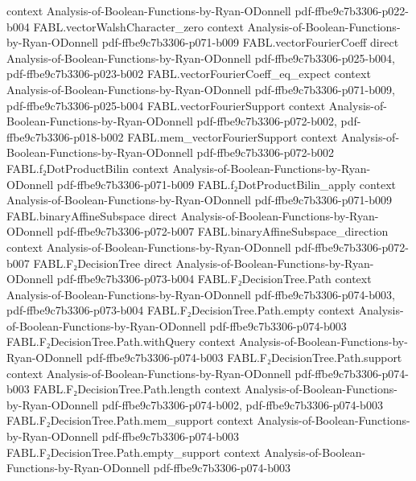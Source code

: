 \begin{theorem}
  {context}
  {Analysis-of-Boolean-Functions-by-Ryan-ODonnell}
  {pdf-ffbe9c7b3306-p022-b004}
\proofstep
  {FABL.vectorWalshCharacter_zero}
  {context}
  {Analysis-of-Boolean-Functions-by-Ryan-ODonnell}
  {pdf-ffbe9c7b3306-p071-b009}
\proofstep
  {FABL.vectorFourierCoeff}
  {direct}
  {Analysis-of-Boolean-Functions-by-Ryan-ODonnell}
  {pdf-ffbe9c7b3306-p025-b004,
    pdf-ffbe9c7b3306-p023-b002}
\proofstep
  {FABL.vectorFourierCoeff_eq_expect}
  {context}
  {Analysis-of-Boolean-Functions-by-Ryan-ODonnell}
  {pdf-ffbe9c7b3306-p071-b009,
    pdf-ffbe9c7b3306-p025-b004}
\proofstep
  {FABL.vectorFourierSupport}
  {context}
  {Analysis-of-Boolean-Functions-by-Ryan-ODonnell}
  {pdf-ffbe9c7b3306-p072-b002,
    pdf-ffbe9c7b3306-p018-b002}
\proofstep
  {FABL.mem_vectorFourierSupport}
  {context}
  {Analysis-of-Boolean-Functions-by-Ryan-ODonnell}
  {pdf-ffbe9c7b3306-p072-b002}
\proofstep
  {FABL.f₂DotProductBilin}
  {context}
  {Analysis-of-Boolean-Functions-by-Ryan-ODonnell}
  {pdf-ffbe9c7b3306-p071-b009}
\proofstep
  {FABL.f₂DotProductBilin_apply}
  {context}
  {Analysis-of-Boolean-Functions-by-Ryan-ODonnell}
  {pdf-ffbe9c7b3306-p071-b009}
\proofstep
  {FABL.binaryAffineSubspace}
  {direct}
  {Analysis-of-Boolean-Functions-by-Ryan-ODonnell}
  {pdf-ffbe9c7b3306-p072-b007}
\proofstep
  {FABL.binaryAffineSubspace_direction}
  {context}
  {Analysis-of-Boolean-Functions-by-Ryan-ODonnell}
  {pdf-ffbe9c7b3306-p072-b007}
\proofstep
  {FABL.F₂DecisionTree}
  {direct}
  {Analysis-of-Boolean-Functions-by-Ryan-ODonnell}
  {pdf-ffbe9c7b3306-p073-b004}
\proofstep
  {FABL.F₂DecisionTree.Path}
  {context}
  {Analysis-of-Boolean-Functions-by-Ryan-ODonnell}
  {pdf-ffbe9c7b3306-p074-b003,
    pdf-ffbe9c7b3306-p073-b004}
\proofstep
  {FABL.F₂DecisionTree.Path.empty}
  {context}
  {Analysis-of-Boolean-Functions-by-Ryan-ODonnell}
  {pdf-ffbe9c7b3306-p074-b003}
\proofstep
  {FABL.F₂DecisionTree.Path.withQuery}
  {context}
  {Analysis-of-Boolean-Functions-by-Ryan-ODonnell}
  {pdf-ffbe9c7b3306-p074-b003}
\proofstep
  {FABL.F₂DecisionTree.Path.support}
  {context}
  {Analysis-of-Boolean-Functions-by-Ryan-ODonnell}
  {pdf-ffbe9c7b3306-p074-b003}
\proofstep
  {FABL.F₂DecisionTree.Path.length}
  {context}
  {Analysis-of-Boolean-Functions-by-Ryan-ODonnell}
  {pdf-ffbe9c7b3306-p074-b002,
    pdf-ffbe9c7b3306-p074-b003}
\proofstep
  {FABL.F₂DecisionTree.Path.mem_support}
  {context}
  {Analysis-of-Boolean-Functions-by-Ryan-ODonnell}
  {pdf-ffbe9c7b3306-p074-b003}
\proofstep
  {FABL.F₂DecisionTree.Path.empty_support}
  {context}
  {Analysis-of-Boolean-Functions-by-Ryan-ODonnell}
  {pdf-ffbe9c7b3306-p074-b003}

\end{theorem}
